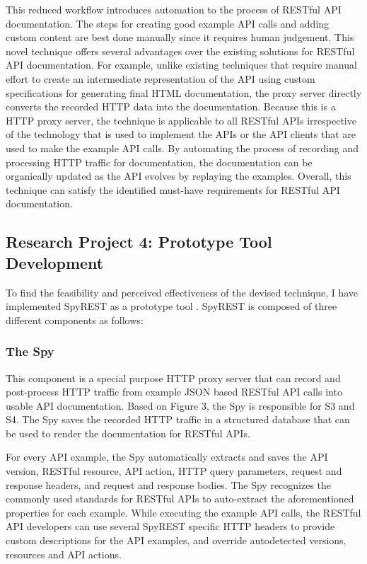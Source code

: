 \documentclass[11pt,oneside]{book}
\begin{document}
This reduced workflow introduces automation to the process of RESTful API documentation. The steps for creating good example API calls and adding custom content are best done manually since it requires human judgement. This novel technique offers several advantages over the existing solutions for RESTful API documentation. For example, unlike existing techniques that require manual effort to create an intermediate representation of the API using custom specifications for generating final HTML documentation, the proxy server directly converts the recorded HTTP data into the documentation. Because this is a HTTP proxy server, the technique is applicable to all RESTful APIs irrespective of the technology that is used to implement the APIs or the API clients that are used to make the example API calls. By automating the process of recording and processing HTTP traffic for documentation, the documentation can be organically updated as the API evolves by replaying the examples. Overall, this technique can satisfy the identified must-have requirements for RESTful API documentation.

\subsection{Research Project 4: Prototype Tool Development}

To find the feasibility and perceived effectiveness of the devised technique, I have implemented SpyREST as a prototype tool \cite{sohan2015spyrest_tool}. SpyREST is composed of three different components as follows:

\subsubsection{The Spy}
This component is a special purpose HTTP proxy server that can record and post-process HTTP traffic from example JSON based RESTful API calls into usable API documentation. Based on Figure 3, the Spy is responsible for S3 and S4. The Spy saves the recorded HTTP traffic in a structured database that can be used to render the documentation for RESTful APIs.

For every API example, the Spy automatically extracts and saves the API version, RESTful resource, API action, HTTP query parameters, request and response headers, and request and response bodies. The Spy recognizes the commonly used standards for RESTful APIs to auto-extract the aforementioned properties for each example. While executing the example API calls, the RESTful API developers can use several SpyREST specific HTTP headers to provide custom descriptions for the API examples, and override autodetected versions, resources and API actions.
\end{document}
